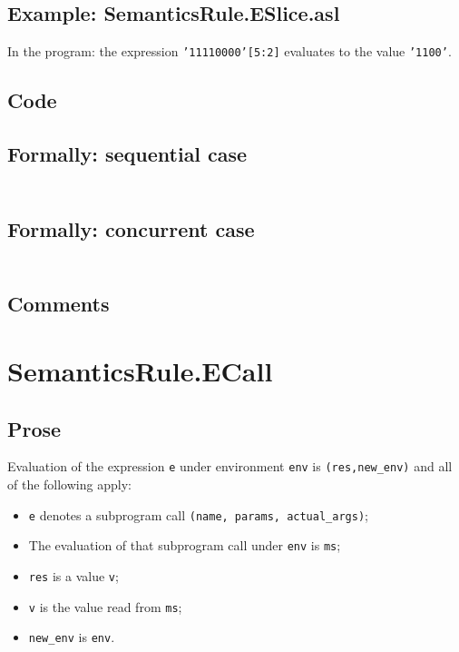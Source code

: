 \documentclass{book}
\begin{document}
  \subsection{Example: SemanticsRule.ESlice.asl}
    In the program:
    the expression \texttt{'11110000'[5:2]} evaluates to the value \texttt{'1100'}.

  \subsection{Code}

  \subsection{Formally: sequential case}
  \begin{align}
  \end{align} 

  \subsection{Formally: concurrent case}
  \begin{align}
  \end{align} 

  \subsection{Comments}

\section{SemanticsRule.ECall \label{sec:SemanticsRule.ECall}}

  \subsection{Prose}
  Evaluation of the expression \texttt{e} under environment \texttt{env} is
  \texttt{(res,new\_env)} and all of the following apply:
  \begin{itemize}
  \item \texttt{e} denotes a subprogram call \texttt{(name, params, actual\_args)};
  \item The evaluation of that subprogram call under \texttt{env} is \texttt{ms};
  \item \texttt{res} is a value \texttt{v};
  \item \texttt{v} is the value read from \texttt{ms};
  \item \texttt{new\_env} is \texttt{env}.
  \end{itemize}
\end{document}
